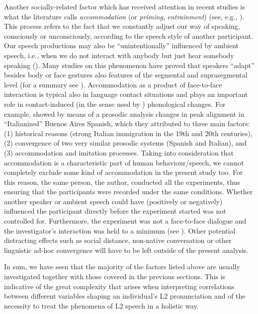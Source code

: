 Another socially-related factor which has received attention in recent studies is what the literature calls \textit{accommodation} (or \textit{priming}, \textit{entrainment}) (see, e.g., \citealt{GilesEtAl1991, PickeringGarrod2004, Pardo2006, HeldnerEtAl2010, Hirschberg2011}). This process refers to the fact that we constantly adjust our way of speaking, consciously or unconsciously, according to the speech style of another participant. Our speech productions may also be “unintentionally” influenced by ambient speech, i.e., when we do not interact with anybody but just hear somebody speaking (\citealt{DelvauxSoquet2007}). Many studies on this phenomenon have proved that speakers “adapt” besides body or face gestures also features of the segmental and suprasegmental level (for a summary see \citealt[4--5]{NiebuhrMichaud2015}). Accommodation as a product of face-to-face interaction is typical also in language contact situations and plays an important role in contact-induced (in the sense used by \citealt{Trudgill1989}) phonological changes. For example, \citet{ColantoniGurlekian2004} showed by means of a prosodic analysis changes in peak alignment in “Italianized” Buenos Aires Spanish, which they attributed to three main factors: (1) historical reasons (strong Italian immigration in the 19th and 20th centuries), (2) convergence of two very similar prosodic systems (Spanish and Italian), and (3) accommodation and imitation processes. Taking into consideration that accommodation is a characteristic part of human behaviour/speech, we cannot completely exclude some kind of accommodation in the present study too. For this reason, the same person, the author, conducted all the experiments, thus ensuring that the participants were recorded under the same conditions. Whether another speaker or ambient speech could have (positively or negatively) influenced the participant directly before the experiment started was not controlled for. Furthermore, the experiment was not a face-to-face dialogue and the investigator’s interaction was held to a minimum (see ). Other potential distracting effects such as social distance, non-native conversation or other linguistic ad-hoc convergence will have to be left outside of the present analysis.



In sum, we have seen that the majority of the factors listed above are usually investigated together with those covered in the previous sections. This is indicative of the great complexity that arises when interpreting correlations between different variables shaping an individual’s L2 pronunciation and of the necessity to treat the phenomena of L2 speech in a holistic way.


